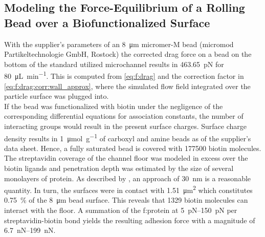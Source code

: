 \subsection{Modeling the Force-Equilibrium of a Rolling Bead over a Biofunctionalized Surface}
\label{sec:res:forcesim}
With the supplier's parameters of an \SI{8}{\micro\meter} micromer-M bead (micromod Partikeltechnologie GmbH, Rostock) the corrected drag force on a bead on the bottom of the standard utilized microchannel results in \SI{463.65}{\pico\newton} for \SI{80}{\micro\liter\per\minute}. This is computed from \cref{eq:f:drag} and the correction factor in \cref{eq:f:drag:corr:wall_approx}, where the simulated flow field integrated over the particle surface was plugged into.\\
If the bead was functionalized with biotin under the negligence of the corresponding differential equations for association constants, the number of interacting groups would result in the present surface charges. Surface charge density results in \SI{1}{\micro\mole\per\gram} of \gls{carboxyl} and \gls{amine} beads as of the supplier's data sheet. Hence, a fully saturated bead is covered with \num{177500} biotin molecules.\\
The streptavidin coverage of the channel floor was modeled in excess over the biotin ligands and penetration depth was estimated by the size of several monolayers of protein. As described by \citet{lit:fluidic:ModelMIT}, an approach of \SI{30}{\nano\meter} is a reasonable quantity. In turn, the surfaces were in contact with \SI{1.51}{\micro\meter\squared} which constitutes \SI{0.75}{\percent} of the \SI{8}{\micro\meter} bead surface. This reveals that \num{1329} biotin molecules can interact with the floor. A summation of the \gls{f:protein} at \SIrange{5}{150}{\pico\newton} per streptavidin-biotin bond yields the resulting adhesion force with a magnitude of \SIrange{6.7}{199}{\nano\newton}.\cite{lit:bio:biotin:rupture} 

